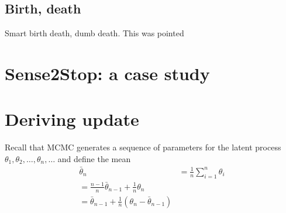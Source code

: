 \documentclass[11pt]{amsart}
\begin{document}
\subsection{Birth, death}

Smart birth death, dumb death.  This was pointed

\section{Sense2Stop: a case study}




\appendix

\section{Deriving update}

Recall that MCMC generates a sequence of parameters for the latent process $\theta_1, \theta_2, \ldots, \theta_n, \ldots$ and define the mean
$$
\begin{aligned}
\bar \theta_n &= \frac{1}{n} \sum_{i=1}^n \theta_i \\
= \frac{n-1}{n} \bar \theta_{n-1} + \frac{1}{n} \theta_n \\
= \bar \theta_{n-1} + \frac{1}{n} (\theta_n - \bar \theta_{n-1}) \\
\end{aligned}
$$
\end{document}

